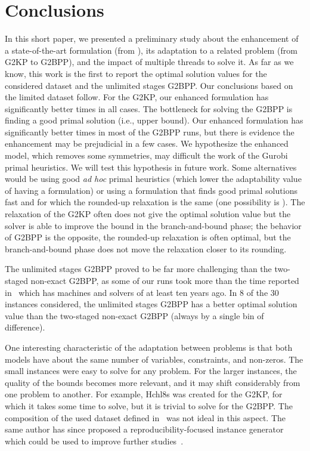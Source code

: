 \documentclass[9pt]{entcs}
\begin{document}
\section{Conclusions}

In this short paper, we presented a preliminary study about the enhancement of a state-of-the-art formulation (from \cite{furini:2016}), its adaptation to a related problem (from G2KP to G2BPP), and the impact of multiple threads to solve it.
As far as we know, this work is the first to report the optimal solution values for the considered dataset and the unlimited stages G2BPP.
Our conclusions based on the limited dataset follow.
For the G2KP, our enhanced formulation has significantly better times in all cases.
The bottleneck for solving the G2BPP is finding a good primal solution (i.e., upper bound).
Our enhanced formulation has significantly better times in most of the G2BPP runs, but there is evidence the enhancement may be prejudicial in a few cases.
We hypothesize the enhanced model, which removes some symmetries, may difficult the work of the Gurobi primal heuristics.
We will test this hypothesis in future work.
Some alternatives would be using good \emph{ad hoc} primal heuristics (which lower the adaptability value of having a formulation) or using a formulation that finds good primal solutions fast and for which the rounded-up relaxation is the same (one possibility is \cite{martin:2020:top}).
The relaxation of the G2KP often does not give the optimal solution value but the solver is able to improve the bound in the branch-and-bound phase; the behavior of G2BPP is the opposite, the rounded-up relaxation is often optimal, but the branch-and-bound phase does not move the relaxation closer to its rounding.

The unlimited stages G2BPP proved to be far more challenging than the two-staged non-exact G2BPP, as some of our runs took more than the time reported in~\cite{silva:2010} which has machines and solvers of at least ten years ago.
In 8 of the 30 instances considered, the unlimited stages G2BPP has a better optimal solution value than the two-staged non-exact G2BPP (always by a single bin of difference).

One interesting characteristic of the adaptation between problems is that both models have about the same number of variables, constraints, and non-zeros.
The small instances were easy to solve for any problem.
For the larger instances, the quality of the bounds becomes more relevant, and it may shift considerably from one problem to another.
For example, Hchl8s was created for the G2KP, for which it takes some time to solve, but it is trivial to solve for the G2BPP.
The composition of the used dataset defined in~\cite{silva:2010} was not ideal in this aspect.
The same author has since proposed a reproducibility-focused instance generator which could be used to improve further studies~\cite{silva:2014}.
\end{document}
